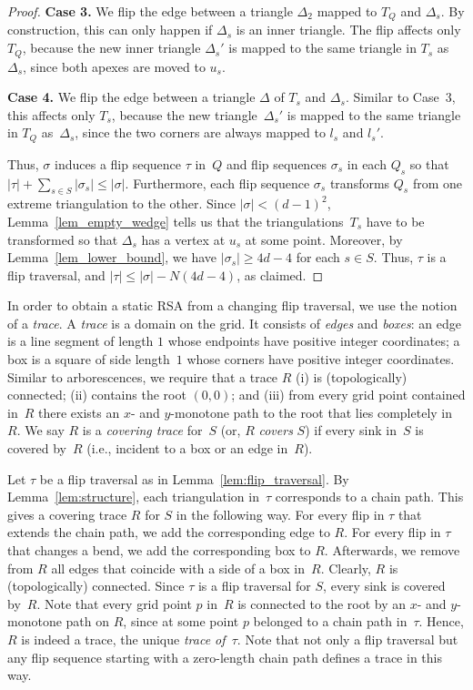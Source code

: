\documentclass[a4paper,11pt]{article}
\newcommand{\qedopt}{}
\begin{document}
\begin{proof}
\textbf{Case 3.}
We flip the edge between a triangle $\Delta_2$ mapped to $T_Q$ and
$\Delta_s$.
By construction, this can only happen if $\Delta_s$ is an inner triangle.
The flip affects only $T_Q$, because the new inner triangle
$\Delta_s'$ is mapped to the same triangle in $T_s$ as $\Delta_s$, since both
apexes are moved to $u_s$.

\textbf{Case 4.}
We flip the edge between a
triangle $\Delta$ of $T_s$ and $\Delta_s$. Similar to Case~3, this
affects only $T_s$, because the new
triangle~$\Delta_s'$ is mapped to the same triangle in $T_Q$ as~$\Delta_s$, 
since the two corners are always
mapped to $l_s$ and $l_s'$.

Thus, $\sigma$ induces a flip sequence
$\tau$ in~$Q$ and flip sequences $\sigma_s$ in each $Q_s$
so that $|\tau| + \sum_{s \in S} |\sigma_s| \leq |\sigma|$.
Furthermore, each flip sequence $\sigma_s$ transforms $Q_s$
from one extreme triangulation to the other.
Since $|\sigma| < (d-1)^2$, Lemma~\ref{lem_empty_wedge} tells us that the 
triangulations~$T_s$ have to be transformed so that $\Delta_s$ has a vertex at $u_s$ at some point. Moreover, by Lemma~\ref{lem_lower_bound}, we have
$|\sigma_s| \geq 4d-4$ for each $s \in S$.
Thus, $\tau$ is a flip traversal,
and $|\tau| \leq |\sigma| - N(4d-4)$, as claimed.
\qedopt
\end{proof}

In order to obtain a static RSA from a changing flip traversal,
we use the notion of a \emph{trace}.
A \emph{trace} is a domain on the grid.
It consists  of \emph{edges} and \emph{boxes}: an edge is a line segment of 
length $1$ whose endpoints have positive integer coordinates; a box is a 
square of side length~$1$ whose corners have positive integer coordinates.
Similar to arborescences, we require that a trace $R$ (i) is (topologically) 
connected; (ii) contains the root $(0,0)$; and (iii) from every grid point 
contained in~$R$ there exists an $x$- and $y$-monotone path to the root 
that lies completely in~$R$.
We say $R$ is a \emph{covering trace} for~$S$ (or, $R$ \emph{covers} $S$) if every sink in~$S$ is covered by~$R$ (i.e., incident to a box or an edge in~$R$).

Let $\tau$ be a flip traversal as in Lemma~\ref{lem:flip_traversal}.
By Lemma~\ref{lem:structure}, each triangulation in~$\tau$ 
corresponds to a chain path.
This gives a covering trace $R$ for $S$ in the following way.
For every flip in $\tau$ that extends 
the chain path, we add the corresponding edge to $R$.
For every flip in $\tau$ that changes a bend, we add the corresponding 
box to $R$. Afterwards, we remove from $R$ all edges that coincide 
with a side of a box in~$R$.
Clearly, $R$ is (topologically) connected. Since $\tau$ is a 
flip traversal for $S$, every sink
is covered by~$R$.
Note that every grid point $p$ in~$R$ is connected to the root by an 
$x$- and $y$-monotone path on $R$, since at some point $p$ belonged
to a chain path in~$\tau$.
Hence, $R$ is indeed a trace, the unique \emph{trace of~$\tau$}.
Note that not only a flip traversal but any flip sequence starting with a zero-length chain path defines a trace in this way.
\end{document}
